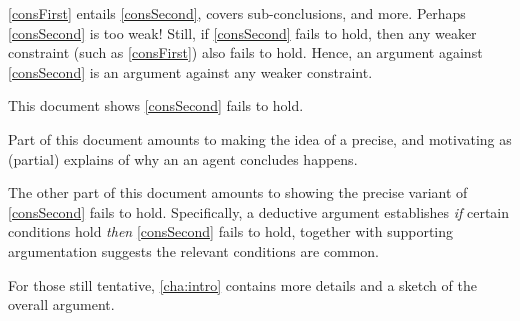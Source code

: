 \begin{note}
  \autoref{consFirst} entails \autoref{consSecond}, covers sub-conclusions, and more.
  Perhaps \autoref{consSecond} is too weak!
  Still, if \autoref{consSecond} fails to hold, then any weaker constraint (such as \autoref{consFirst}) also fails to hold.
  Hence, an argument against \autoref{consSecond} is an argument against any weaker constraint.
\end{note}

\begin{note}
  This document shows \autoref{consSecond} fails to hold.

  Part of this document amounts to making the idea of a \fingfr{} precise, and motivating  as (partial) explains of why an \eiw{} an agent concludes happens.

  The other part of this document amounts to showing the precise variant of \autoref{consSecond} fails to hold.
  Specifically, a deductive argument establishes \emph{if} certain conditions hold \emph{then} \autoref{consSecond} fails to hold, together with supporting argumentation suggests the relevant conditions are common.

  For those still tentative, \autoref{cha:intro} contains more details and a sketch of the overall argument.
\end{note}





